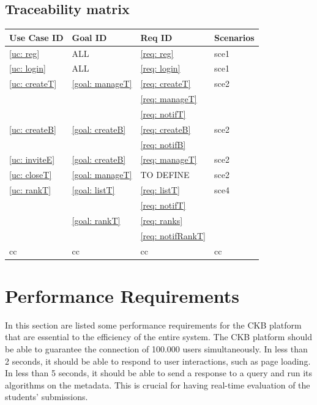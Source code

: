     \subsection{Traceability matrix}
    \begin{table}[h]
	    \centering
            \renewcommand{\arraystretch}{1.5}
            \begin{tabular}{|m{3cm}|m{3cm}|m{3cm}|m{3cm}|}
                \hline
                \textbf{Use Case ID} & \textbf{Goal ID} & \textbf{Req ID} & \textbf{Scenarios} \\
                \hline
                \ref{uc: reg} & ALL & \ref{req: reg} & sce1  \\
                \hline
                \ref{uc: login} & ALL & \ref{req: login} & sce1  \\
                \hline
                \ref{uc: createT} & \ref{goal: manageT} & \ref{req: createT} & sce2  \\
                \null & \null  & \ref{req: manageT}&\null \\
                \null & \null  & \ref{req: notifT}&\null \\
                \hline
                \ref{uc: createB} & \ref{goal: createB} & \ref{req: createB} & sce2  \\
                \null & \null  & \ref{req: notifB}&\null \\
                \hline
                \ref{uc: inviteE} & \ref{goal: createB} & \ref{req: manageT} & sce2  \\
                \hline
                \ref{uc: closeT} & \ref{goal: manageT} & TO DEFINE & sce2  \\
                \hline
                \ref{uc: rankT} & \ref{goal: listT} & \ref{req: listT} & sce4  \\
                \null & \null  & \ref{req: notifT}&\null \\
                \null & \ref{goal: rankT}  & \ref{req: ranks}&\null \\
                \null & \null  & \ref{req: notifRankT}&\null \\
                \hline
                cc & cc & cc & cc  \\
                \hline 
            \end{tabular}
    \end{table}
    
\clearpage
\section{Performance Requirements}
In this section are listed some performance requirements for the CKB platform that are essential to the efficiency of the entire system.
The CKB platform should be able to guarantee the connection of 100.000 users simultaneously. \newline 
In less than 2 seconds, it should be able to respond to user interactions, such as page loading. \newline
In less than 5 seconds, it should be able to send a response to a query and run its algorithms on the metadata. This is crucial for having real-time evaluation of the students' submissions.

